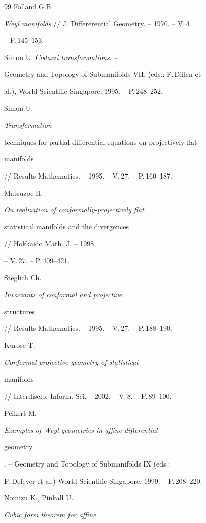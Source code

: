 \begin{thebibliography}{99}
Folland G.B.

{\it Weyl manifolds} // J. Differerential Geometry. -- 1970. -- V.\,4.

-- P.\,145--153.




Simon U. {\it Codazzi transformations}. --

Geometry and Topology of Submanifolds VII, (eds.: F.\,Dillen et

al.), World Scientific Singapore, 1995. -- P.\,248--252.




Simon U. {\it Transformation

techniques for partial differential equations on projectively flat

manifolds} // Results Mathematics. -- 1995. -- V.\,27. -- P.\,160--187.




Matsuzoe H. {\it On realization of conformally-projectively flat

statistical manifolds and the divergences} // Hokkaido Math. J. -- 1998.

-- V.\,27. -- P.\,409--421.




Steglich Ch. {\it Invariants of conformal and projective

structures} // Results Mathematics. -- 1995. -- V.\,27. -- P.\,188--190.




Kurose T. {\it Conformal-projective geometry of statistical

manifolds} // Interdiscip. Inform. Sci. -- 2002. -- V.\,8. -- P.\,89--100.




Peikert M. {\it Examples of Weyl geometries in affine differential

geometry}. -- Geometry and Topology of Submanifolds IX (eds.:

F.\,Defever et al.) World Scientific Singapore, 1999. -- P.\,208--220.




Nomizu K., Pinkall U. {\it Cubic form theorem for affine

}
\end{thebibliography}
